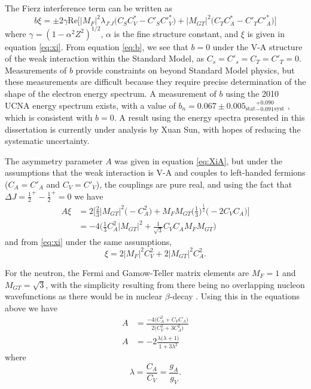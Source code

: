 The Fierz interference term can be written as
\begin{equation}
  b\xi = \pm 2\gamma \mathrm{Re}\bigg[|M_{F}|^2 \lambda_{J'J}\big(C_SC^*_V-C'_SC'^*_V \big) 
    + |M_{GT}|^2\big(C_TC^*_A-C'_TC'^*_A \big) \bigg]
  \label{eq:b}
\end{equation}
where $\gamma = (1-\alpha ^2 Z^2)^{1/2}$, $\alpha$ is the fine structure constant, and $\xi$ is given in
equation \ref{eq:xi}. From equation \ref{eq:b}, we see that $b=0$ under the V-A structure
of the weak interaction within the Standard Model, as
$C_s = C'_s = C_T = C'_T = 0$. Measurements of $b$ provide constraints on
beyond Standard Model physics, but these measurements are difficult because they
require precise determination of the shape of the electron energy spectrum. A measurement of
$b$ using the 2010 UCNA energy spectrum exists, with a value of
$b_n = 0.067 \pm 0.005_{\mathrm{stat}}{}^{+ 0.090}_{-0.091}{}_{\mathrm{syst}}$ \cite{hickerson2017}, which is consistent with
$b=0$. A result using the energy
spectra presented in this dissertation is currently under analysis by Xuan Sun, with hopes of reducing the
systematic uncertainty.

The asymmetry parameter $A$ was given in equation \ref{eq:XiA}, but under the assumptions that the
weak interaction is V-A and couples to left-handed fermions ($C_A=C'_A$ and $C_V=C'_V$), the couplings
are pure real, and using the fact that
$\Delta J = {\frac{1}{2}}^+ - {\frac{1}{2}}^+ = 0$ we have
%
\begin{align}
  A\xi &= 2\bigg[ \frac{2}{3} |M_{GT}|^2 \Big(-C_A^2\Big) 
    + M_FM_{GT}\Big(\frac{1}{3}\Big)^{\frac{1}{2}}\big(-2C_VC_A \big) \bigg] \\
  &=-4 \bigg( \frac{1}{3}C_A^2|M_{GT}|^2 + \frac{1}{\sqrt{3}} C_VC_A M_FM_{GT} \bigg)
  \label{eq:XiAsimple}
\end{align}
%
and from \ref{eq:xi} under the same assumptions,
%
\begin{equation}
  \xi = 2|M_F|^2C_V^2+2|M_{GT}|^2C_A^2.
\end{equation}
%

For the neutron, the Fermi and Gamow-Teller matrix elements are $M_F=1$ and
$M_{GT} = \sqrt{3}$, with the simplicity resulting from there being no
overlapping nucleon wavefunctions as there would be in nuclear $\beta$-decay
\cite{grotz1990}. Using this in the equations above we have
%
\begin{align}
  A & =\frac{-4 \big( C_A^2 +  C_VC_A \big)}{2 \big(C_V^2 + 3C_A^2\big)} \\
  A & = -2 \frac{ \lambda \big(\lambda+1\big)}{ 1 + 3\lambda^2}
\end{align}
%
where
%
\begin{equation}
  \lambda = \frac{C_A}{C_V} = \frac{g_A}{g_V}.
\end{equation}

